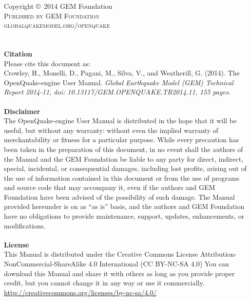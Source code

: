 \documentclass[11pt,fleqn]{book} %
\begin{document}
\noindent Copyright \copyright\ 2014 GEM Foundation\\ %

\noindent \textsc{Published by GEM Foundation}\\ %

\noindent \textsc{globalquakemodel.org/openquake}\\ %

\vspace{0.4cm} \hfill \\
\noindent \hfill \\
   {\textbf{Citation}} \hfill \\
   Please cite this document as: \hfill \\
   Crowley, H., Monelli, D., Pagani, M., Silva, V., 
   and Weatherill, G. (2014). 
   The OpenQuake-engine User Manual. 
   \textit{Global Earthquake Model (GEM) Technical Report 2014-11, 
   doi: 10.13117/\-GEM.OPENQUAKE.\-TR2014.11, 155 pages.} \\
   \hfill \\

\noindent
   {\bf{Disclaimer}} \hfill \\
   The OpenQuake-engine User Manual is distributed in the hope that it will be 
   useful, but without any warranty: without even the implied warranty of 
   merchantability or fitness for a particular purpose. While every precaution 
   has been taken in the preparation of this document, in no event shall the 
   authors of the Manual and the GEM Foundation be liable to any party for 
   direct, indirect, special, incidental, or consequential damages, including 
   lost profits, arising out of the use of information contained in this 
   document or from the use of programs and source code that may accompany it, 
   even if the authors and GEM Foundation have been advised of the possibility 
   of such damage. The Manual provided hereunder is on as ``as is'' basis, and the 
   authors and GEM Foundation have no obligations to provide maintenance, 
   support, updates, enhancements, or modifications. \hfill \\
   \hfill \\
\noindent
   {\bf{License}} \hfill \\
   This Manual is distributed under the Creative Commons License 
   Attribution-NonCommercial-ShareAlike 4.0 International (CC BY-NC-SA 4.0)
   You can download this Manual and share it with 
   others as long as you provide proper credit, but you cannot change 
   it in any way or use it commercially.\hfill \\
   \href{http://creativecommons.org/licenses/by-nc-sa/4.0/}
   {http://creativecommons.org/licenses/by-nc-sa/4.0/}\hfill \\
\end{document}
